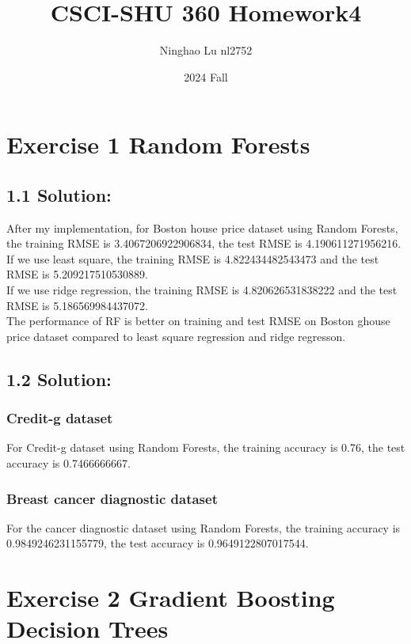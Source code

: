 \documentclass{article}
\title{CSCI-SHU 360 Homework4}
\author{Ninghao Lu nl2752}
\date{2024 Fall}
\begin{document}
\maketitle

\section*{Exercise 1 Random Forests}
\subsection*{1.1 Solution:}
After my implementation, for Boston house price dataset using Random Forests, the training RMSE is 3.4067206922906834, the test RMSE is 4.190611271956216.\\
If we use least square, the training RMSE is 4.822434482543473 and the test RMSE is 5.209217510530889.\\
If we use ridge regression, the training RMSE is 4.820626531838222 and the test RMSE is 5.186569984437072.\\
The performance of RF is better on training and test RMSE on Boston ghouse price dataset compared to least square regression and ridge regresson.
\subsection*{1.2 Solution:}
\subsubsection*{Credit-g dataset}
For Credit-g dataset using Random Forests, the training accuracy is 0.76, the test accuracy is 0.7466666667.

\subsubsection*{Breast cancer diagnostic dataset}
For the cancer diagnostic dataset using Random Forests, the training accuracy is 0.9849246231155779, the test accuracy is 0.9649122807017544.

\section*{Exercise 2 Gradient Boosting Decision Trees}
\end{document}
